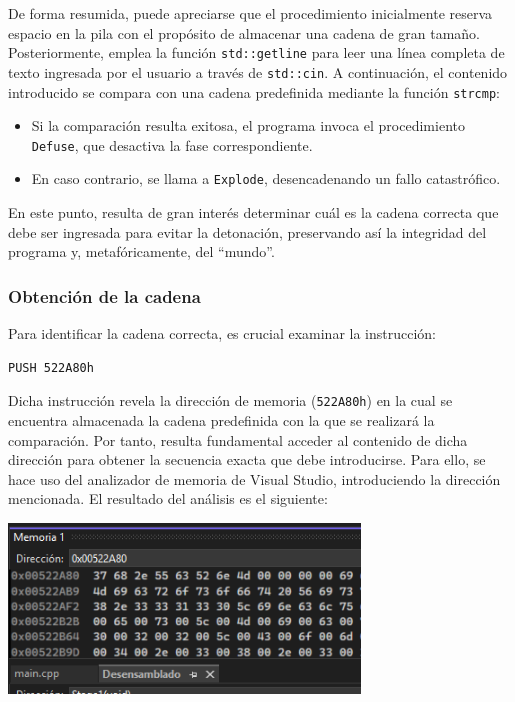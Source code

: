 \documentclass[11pt,a4paper]{article}
\begin{document}
\noindent De forma resumida, puede apreciarse que el procedimiento inicialmente reserva espacio en la pila con el propósito de almacenar una cadena de gran tamaño. Posteriormente, emplea la función \texttt{std::getline} para leer una línea completa de texto ingresada por el usuario a través de \texttt{std::cin}. A continuación, el contenido introducido se compara con una cadena predefinida mediante la función \texttt{strcmp}:

\begin{itemize}
  \item Si la comparación resulta exitosa, el programa invoca el procedimiento \texttt{Defuse}, que desactiva la fase correspondiente.
  \item En caso contrario, se llama a \texttt{Explode}, desencadenando un fallo catastrófico.
\end{itemize}

\noindent En este punto, resulta de gran interés determinar cuál es la cadena correcta que debe ser ingresada para evitar la detonación, preservando así la integridad del programa y, metafóricamente, del ``mundo''.

\vspace{3ex}

\subsubsection{Obtención de la cadena}

\noindent Para identificar la cadena correcta, es crucial examinar la instrucción:

\vspace{1ex}
\begin{lstlisting}[style=assemblyStyle]
  PUSH 522A80h
\end{lstlisting}
\vspace{2ex}

\noindent Dicha instrucción revela la dirección de memoria (\texttt{522A80h}) en la cual se encuentra almacenada la cadena predefinida con la que se realizará la comparación. Por tanto, resulta fundamental acceder al contenido de dicha dirección para obtener la secuencia exacta que debe introducirse. Para ello, se hace uso del analizador de memoria de Visual Studio, introduciendo la dirección mencionada. El resultado del análisis es el siguiente:\vspace{1ex}
\begin{center}
\includegraphics[width=0.7\textwidth]{s1-2.png}
\end{center}
\vspace{2ex}
\end{document}
